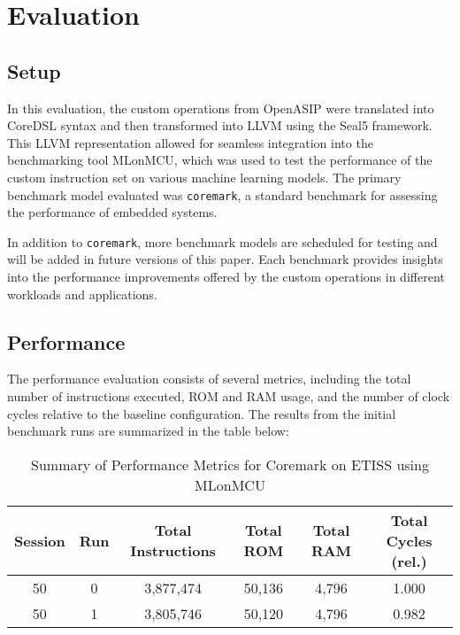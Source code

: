 \section{Evaluation}

\subsection{Setup}

In this evaluation, the custom operations from OpenASIP were translated into CoreDSL syntax and then transformed into LLVM using the Seal5 framework. This LLVM representation allowed for seamless integration into the benchmarking tool MLonMCU, which was used to test the performance of the custom instruction set on various machine learning models. The primary benchmark model evaluated was \texttt{coremark}, a standard benchmark for assessing the performance of embedded systems.

In addition to \texttt{coremark}, more benchmark models are scheduled for testing and will be added in future versions of this paper. Each benchmark provides insights into the performance improvements offered by the custom operations in different workloads and applications.

\subsection{Performance}

The performance evaluation consists of several metrics, including the total number of instructions executed, ROM and RAM usage, and the number of clock cycles relative to the baseline configuration. The results from the initial benchmark runs are summarized in the table below:

\begin{table}[h!]
    \centering
    \begin{tabular}{|c|c|c|c|c|c|}
        \hline
        \textbf{Session} & \textbf{Run} & \textbf{Total Instructions} & \textbf{Total ROM} & \textbf{Total RAM} & \textbf{Total Cycles (rel.)} \\
        \hline
        50  & 0 & 3,877,474 & 50,136 & 4,796 & 1.000 \\
        50  & 1 & 3,805,746 & 50,120 & 4,796 & 0.982 \\
        \hline
    \end{tabular}
    \caption{Summary of Performance Metrics for Coremark on ETISS using MLonMCU}
\end{table}

